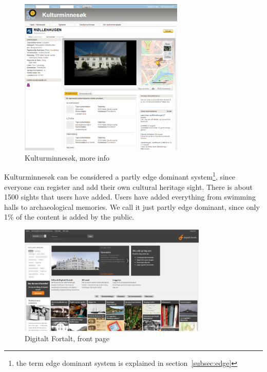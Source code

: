 \documentclass[11pt]{book}
\begin{document}
\begin{figure}[H]
      \centering
      \includegraphics[width=0.7\textwidth]{Figures/Prestudy/kulturminnesokMoreInfo.png}
      \caption{Kulturminnesøk, more info}
      \label{fig:pre_kulturMoreInfo}
\end{figure}

Kulturminnesøk can be considered a partly edge dominant system\footnote{the term edge dominant system is explained in section~\ref{subsec:edge}}, since everyone can register and add their own cultural heritage sight. There is about 1500 sights that users have added. Users have added everything from swimming halls to archaeological memories. We call it just partly edge dominant, since only 1\% of the content is added by the public.

\begin{figure}[H]
      \centering
      \includegraphics[width=0.8\textwidth]{Figures/Prestudy/digitaltfortaltForside.png}
      \caption{Digitalt Fortalt, front page}
      \label{fig:pre_fortaltFrontPage}
\end{figure}
\end{document}

